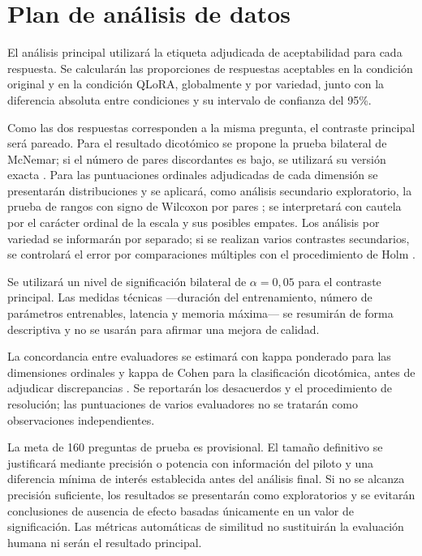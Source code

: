 \section{Plan de análisis de datos}\label{plan-de-anuxe1lisis-de-datos}

El análisis principal utilizará la etiqueta adjudicada de aceptabilidad para cada respuesta. Se calcularán las proporciones de respuestas aceptables en la condición original y en la condición QLoRA, globalmente y por variedad, junto con la diferencia absoluta entre condiciones y su intervalo de confianza del 95\%.

Como las dos respuestas corresponden a la misma pregunta, el contraste principal será pareado. Para el resultado dicotómico se propone la prueba bilateral de McNemar; si el número de pares discordantes es bajo, se utilizará su versión exacta \parencite{McNemar1947}. Para las puntuaciones ordinales adjudicadas de cada dimensión se presentarán distribuciones y se aplicará, como análisis secundario exploratorio, la prueba de rangos con signo de Wilcoxon por pares \parencite{Wilcoxon1945}; se interpretará con cautela por el carácter ordinal de la escala y sus posibles empates. Los análisis por variedad se informarán por separado; si se realizan varios contrastes secundarios, se controlará el error por comparaciones múltiples con el procedimiento de Holm \parencite{Holm1979}.

Se utilizará un nivel de significación bilateral de $\alpha=0{,}05$ para el contraste principal. Las medidas técnicas —duración del entrenamiento, número de parámetros entrenables, latencia y memoria máxima— se resumirán de forma descriptiva y no se usarán para afirmar una mejora de calidad.

La concordancia entre evaluadores se estimará con kappa ponderado para las dimensiones ordinales y kappa de Cohen para la clasificación dicotómica, antes de adjudicar discrepancias \parencite{Cohen1960,Cohen1968}. Se reportarán los desacuerdos y el procedimiento de resolución; las puntuaciones de varios evaluadores no se tratarán como observaciones independientes.

La meta de 160 preguntas de prueba es provisional. El tamaño definitivo se justificará mediante precisión o potencia con información del piloto y una diferencia mínima de interés establecida antes del análisis final. Si no se alcanza precisión suficiente, los resultados se presentarán como exploratorios y se evitarán conclusiones de ausencia de efecto basadas únicamente en un valor de significación. Las métricas automáticas de similitud no sustituirán la evaluación humana ni serán el resultado principal.


